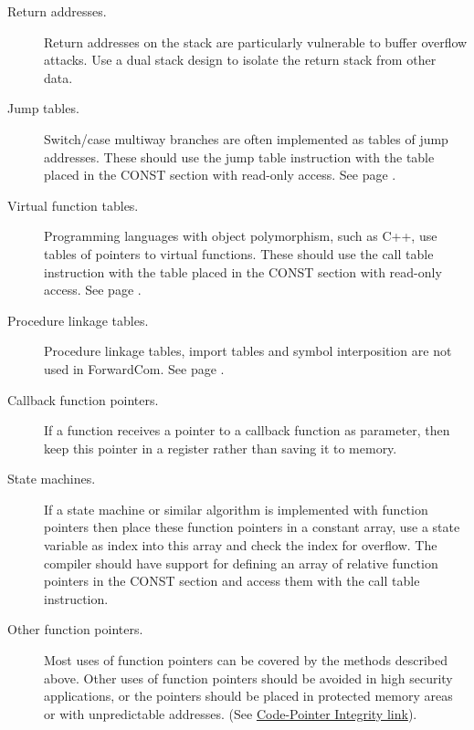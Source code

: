 \documentclass[forwardcom.tex]{subfiles}
\begin{document}
\begin{description}
\item[Return addresses.] Return addresses on the stack are particularly vulnerable to buffer overflow attacks. Use a dual stack design to isolate the return stack from other data.

\item[Jump tables.] Switch/case multiway branches are often implemented as tables of jump addresses. These should use the jump table instruction with the table placed in the CONST section with read-only access. See page \pageref{jumpTableInstruction}.

\item[Virtual function tables.] Programming languages with object polymorphism, such as C++, use tables of pointers to virtual functions. These should use the call table instruction with the table placed in the CONST section with read-only access. See page \pageref{jumpTableInstruction}.

\item[Procedure linkage tables.] Procedure linkage tables, import tables and symbol interposition are not used in ForwardCom. See page \pageref{libraryLinkMethods}.

\item[Callback function pointers.] If a function receives a pointer to a callback function as parameter, then keep this pointer in a register rather than saving it to memory.

\item[State machines.] If a state machine or similar algorithm is implemented with function pointers then place these function pointers in a constant array, use a state variable as index into this array and check the index for overflow. The compiler should have support for defining an array of relative function pointers in the CONST section and access them with the call table instruction.

\item[Other function pointers.] Most uses of function pointers can be covered by the methods described above. Other uses of function pointers should be avoided in high security applications, or the pointers should be placed in protected memory areas or with unpredictable addresses. (See
\href{http://dslab.epfl.ch/proj/cpi/}{Code-Pointer Integrity link}).

\end{description}
\end{document}
